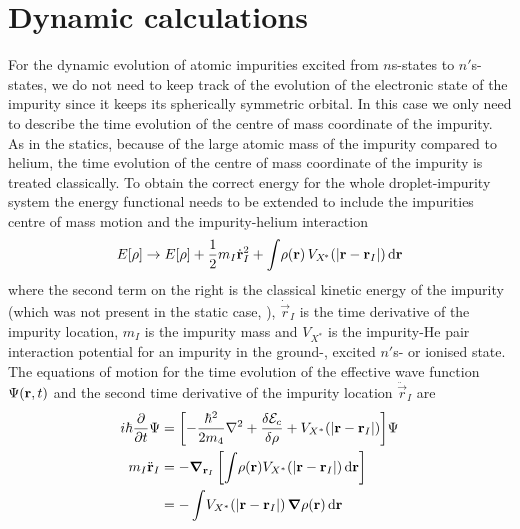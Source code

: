 	\section{Dynamic calculations}\label{sec:td-dft}
		For the dynamic evolution of atomic impurities excited from $n$s-states to $n'$s-states, we do not need to keep track of the evolution of the electronic state of the impurity since it keeps its spherically symmetric orbital. In this case we only need to describe the time evolution of the centre of mass coordinate of the impurity. As in the statics, because of the large atomic mass of the impurity compared to helium, the time evolution of the centre of mass coordinate of the impurity is treated classically. To obtain the correct energy for the whole droplet-impurity system the energy functional needs to be extended to include the impurities centre of mass motion and the impurity-helium interaction
		\begin{align}
			E[\rho] \rightarrow E[\rho] + \frac{1}{2}m_I\dot{\bm{\mathrm{r}}}^2_I + \int \! \rho(\bm{\mathrm{r}}) \, V_{X^{\!*}}\qty(\abs{\bm{\mathrm{r}}-\bm{\mathrm{r}}_I})\,\mathrm{d}{\bm{\mathrm{r}}} \label{eq33}
		\end{align}
		where the second term on the right is the classical kinetic energy of the impurity (which was not present in the static case, ), $\dot{\vec{r}}_I$ is the time derivative of the impurity location, $m_I$ is the impurity mass and $V_{X^{\!*}}$ is the impurity-He pair interaction potential for an impurity in the ground-, excited $n'$s- or ionised state. The equations of motion for the time evolution of the effective wave function $\Psi\qty(\bm{\mathrm{r}},t)$ and the second time derivative of the impurity location $\ddot{\vec{r}}_I$ are  
		\begin{align}
			i\hbar\frac{\partial}{\partial t} \Psi &= \qty[-\frac{\hbar^2}{2m_4} \laplacian +\frac{\delta {\cal E}_c}{\delta \rho} + V_{X^*}(|\mathbf{r}- \mathbf{r}_I|)]\Psi\nonumber\\
			m_I \ddot{\mathbf{r}}_I &= - \grad_{\vec{r}_I} \left[  \int \!\rho(\mathbf{r}) V_{X^*}(|\mathbf{r}- \mathbf{r}_I|)\diff{r}  \right] \nonumber \\
			&= -\int \! V_{X^*}(|\mathbf{r}- \mathbf{r}_I|)  \, \grad \rho(\mathbf{r})\diff{r} \label{eq34}
		\end{align}
	
